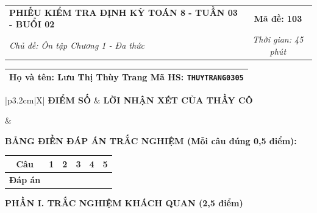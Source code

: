 \documentclass[12pt,a4paper]{article}
\begin{document}
\newpage


\noindent
\begin{tabularx}{\linewidth}{|X|c|}
\hline
\textbf{PHIẾU KIỂM TRA ĐỊNH KỲ TOÁN 8 - TUẦN 03 - BUỔI 02} & \textbf{Mã đề: 103} \\
\textit{Chủ đề: Ôn tập Chương 1 - Đa thức} & \textit{Thời gian: 45 phút} \\
\hline
\end{tabularx}

\vspace{1mm}

\noindent
\begin{tabularx}{\linewidth}{|X|}
\hline
\rule[-2mm]{0pt}{7.5mm}\textbf{Họ và tên:} \textbf{\large Lưu Thị Thùy Trang} \hfill \textbf{Mã HS:} \texttt{THUYTRANG0305} \quad \\
\hline
\end{tabularx}

\vspace{1mm}

\noindent
\begin{tabularx}{\linewidth}{|p{3.2cm}|X|}
\hline
\centering\textbf{ĐIỂM SỐ} & \centering\textbf{LỜI NHẬN XÉT CỦA THẦY CÔ} \tabularnewline
\hline
\rule{0pt}{1.3cm} & \tabularnewline
\hline
\end{tabularx}

\vspace{1.2mm}

\noindent\textbf{BẢNG ĐIỀN ĐÁP ÁN TRẮC NGHIỆM (Mỗi câu đúng 0,5 điểm):}
\vspace{0.8mm}

\noindent
\renewcommand{\arraystretch}{1.35}
\begin{tabularx}{\linewidth}{|c|*{5}{>{\centering\arraybackslash}X|}}
\hline
\textbf{Câu} & \textbf{1} & \textbf{2} & \textbf{3} & \textbf{4} & \textbf{5} \\
\hline
\textbf{Đáp án} & & & & & \\
\hline
\end{tabularx}
\renewcommand{\arraystretch}{1.0}

\vspace{1.5mm}

\noindent\textbf{\large PHẦN I. TRẮC NGHIỆM KHÁCH QUAN (2,5 điểm)}
\vspace{1mm}
\end{document}
